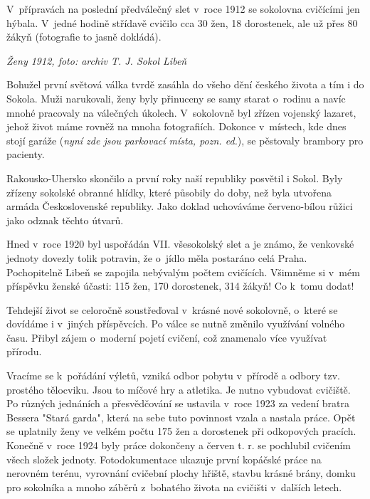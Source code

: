 \documentclass[a5paper, 12pt, twoside]{article}
\begin{document}
V~přípravách na poslední předválečný slet v~roce 1912 se sokolovna
cvičícími jen hýbala. V~jedné hodině střídavě cvičilo cca 30 žen, 18
dorostenek, ale už přes 80 žákyň (fotografie to jasně dokládá).


\textit{Ženy 1912, foto: archiv T. J. Sokol Libeň}

Bohužel první světová válka tvrdě zasáhla do všeho dění českého života a
tím i do Sokola. Muži narukovali, ženy byly přinuceny se samy starat
o~rodinu a navíc mnohé pracovaly na válečných úkolech. V~sokolovně byl
zřízen vojenský lazaret, jehož život máme rovněž na mnoha fotografiích.
Dokonce v~místech, kde dnes stojí garáže (\textit{nyní zde jsou parkovací
místa, pozn. ed.}), se pěstovaly brambory pro pacienty.

Rakousko-Uhersko skončilo a první roky naší republiky posvětil i Sokol.
Byly zřízeny sokolské obranné hlídky, které působily do doby, než byla
utvořena armáda Československé republiky. Jako doklad uchováváme
červeno-bílou růžici jako odznak těchto útvarů.

Hned v~roce 1920 byl uspořádán VII. všesokolský slet a je známo, že
venkovské jednoty dovezly tolik potravin, že o~jídlo měla postaráno celá
Praha. Pochopitelně Libeň se zapojila nebývalým počtem cvičících.
Všimněme si v~mém příspěvku ženské účasti: 115 žen, 170 dorostenek, 314
žákyň! Co k~tomu dodat!

Tehdejší život se celoročně soustřeďoval v~krásné nové sokolovně,
o~které se dovídáme i v~jiných příspěvcích. Po válce se nutně změnilo
využívání volného času. Přibyl zájem o~moderní pojetí cvičení, což
znamenalo více využívat přírodu.

Vracíme se k~pořádání výletů, vzniká odbor pobytu v~přírodě a odbory
tzv. prostého tělocviku. Jsou to míčové hry a atletika. Je nutno
vybudovat cvičiště. Po různých jednáních a přesvědčování se ustavila
v~roce 1923 za vedení bratra Bessera "Stará garda", která na sebe tuto
povinnost vzala a nastala práce. Opět se uplatnily ženy ve velkém počtu
175 žen a dorostenek při odkopových pracích. Konečně v~roce 1924 byly
práce dokončeny a červen t. r. se pochlubil cvičením všech složek
jednoty. Fotodokumentace ukazuje první kopáčské práce na nerovném
terénu, vyrovnání cvičební plochy hřiště, stavbu krásné brány, domku pro
sokolníka a mnoho záběrů z~bohatého života na cvičišti v~dalších letech.

\end{document}
